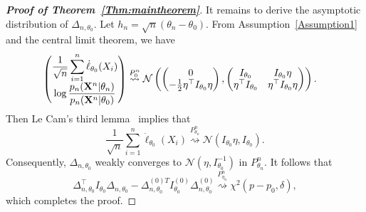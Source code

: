 \documentclass[11pt]{article}
\theoremstyle{plain}
\theoremstyle{definition}
\theoremstyle{remark}
\begin{document}
\begin{appendices}
\begin{proof}[\textbf{Proof of Theorem~\ref{Thm:maintheorem}}]
It remains to derive the asymptotic distribution of $\Delta_{n,\theta_0}$.
Let $h_n=\sqrt{n}(\theta_n-\theta_0)$.
     From Assumption~\ref{Assumption1} and the central limit theorem, we have
\begin{equation*}
    \begin{split}
    \left(
    \begin{matrix}
        \displaystyle
        \frac{1}{\sqrt{n}}\sum^n_{i=1}\dot{\ell}_{\theta_0}(X_i)
        \\
        \displaystyle
        \log \frac{p_n(\mathbf{X}^{n}|\theta_n)}{p_n(\mathbf{X}^{n}|\theta_0)}
    \end{matrix}
    \right)
    &\overset{P_0^n}{\rightsquigarrow}
    \mathcal{N}\left(
    \left(
    \begin{matrix}
        0\\
        -\frac{1}{2}\eta^\top  I_{\theta_0}\eta
    \end{matrix}
    \right),
    \left(
        \begin{matrix}
            I_{\theta_0}&I_{\theta_0}\eta\\
            \eta^\top  I_{\theta_0}&\eta^\top  I_{\theta_0}\eta
        \end{matrix}
    \right)
    \right).
    \end{split}
\end{equation*}
Then Le Cam's third lemma~\citep[Example 6.7]{van2000asymptotic} implies that
\begin{equation*}
    \frac{1}{\sqrt{n}}\sum^n_{i=1}\dot{\ell}_{\theta_0}(X_i)\overset{P^n_{\theta_n}}{\rightsquigarrow} \mathcal{N}(I_{\theta_0}\eta,I_{\theta_0}).
\end{equation*}
Consequently,
$
\Delta_{n,\theta_0}
$
weakly converges to $\mathcal{N}(\eta, I_{\theta_0}^{-1})$ in  $P^n_{\theta_n}$.
It follows that
\begin{equation*}
\Delta_{n,\theta_0}^\top  I_{\theta_0} \Delta_{n,\theta_0}
-
\Delta_{n,\theta_0}^{{(0)}T} I^{(0)}_{\theta_0} \Delta^{(0)}_{n,\theta_0}
\overset{P_{\eta_n}^n}{\rightsquigarrow} \chi^2(p-p_0,\delta),
\end{equation*}
which completes the proof.


\end{proof}
\end{appendices}
\end{document}

